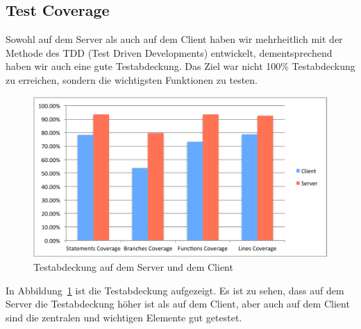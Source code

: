 	\subsection{Test Coverage}
	Sowohl auf dem Server als auch auf dem Client haben wir mehrheitlich mit der Methode des TDD (Test Driven Developments) entwickelt,
	dementsprechend haben wir auch eine gute Testabdeckung.
	Das Ziel war nicht 100\% Testabdeckung zu erreichen, sondern die wichtigsten Funktionen zu testen.
	\begin{figure}[H]
		\includegraphics[width=\textwidth]{projectPlan/media/img/coverage.pdf}
		\centering
		\caption{Testabdeckung auf dem Server und dem Client}
		\label{fig:coverage}
	\end{figure}
	In Abbildung\ \ref{fig:coverage} ist die Testabdeckung aufgezeigt.
	Es ist zu sehen, dass auf dem Server die Testabdeckung höher ist als auf dem Client,
	aber auch auf dem Client sind die zentralen und wichtigen Elemente gut getestet.
	
